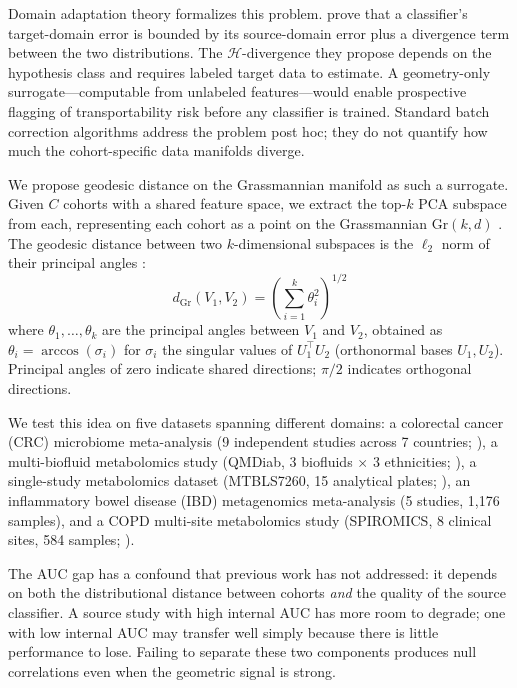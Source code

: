 \documentclass{article}
\begin{document}
Domain adaptation theory formalizes this problem. \citet{bendavid2010theory} prove that a classifier's target-domain error is bounded by its source-domain error plus a divergence term between the two distributions. The $\mathcal{H}$-divergence they propose depends on the hypothesis class and requires labeled target data to estimate. A geometry-only surrogate---computable from unlabeled features---would enable prospective flagging of transportability risk before any classifier is trained. Standard batch correction algorithms \citep{johnson2007adjusting} address the problem post hoc; they do not quantify how much the cohort-specific data manifolds diverge.

We propose geodesic distance on the Grassmannian manifold as such a surrogate. Given $C$ cohorts with a shared feature space, we extract the top-$k$ PCA subspace from each, representing each cohort as a point on the Grassmannian $\mathrm{Gr}(k, d)$ \citep{edelman1998geometry}. The geodesic distance between two $k$-dimensional subspaces is the $\ell_2$ norm of their principal angles \citep{bjorck1973numerical, ye2016schubert}:
\begin{equation}
d_{\mathrm{Gr}}(V_1, V_2) = \left(\sum_{i=1}^{k} \theta_i^2\right)^{1/2}
\end{equation}
where $\theta_1, \ldots, \theta_k$ are the principal angles between $V_1$ and $V_2$, obtained as $\theta_i = \arccos(\sigma_i)$ for $\sigma_i$ the singular values of $U_1^\top U_2$ (orthonormal bases $U_1, U_2$). Principal angles of zero indicate shared directions; $\pi/2$ indicates orthogonal directions.

We test this idea on five datasets spanning different domains: a colorectal cancer (CRC) microbiome meta-analysis (9 independent studies across 7 countries; \citealp{wirbel2019meta}), a multi-biofluid metabolomics study (QMDiab, 3 biofluids $\times$ 3 ethnicities; \citealp{yousri2015metabolic}), a single-study metabolomics dataset (MTBLS7260, 15 analytical plates; \citealp{leonletelier2024contributions}), an inflammatory bowel disease (IBD) metagenomics meta-analysis (5 studies, 1{,}176 samples), and a COPD multi-site metabolomics study (SPIROMICS, 8 clinical sites, 584 samples; \citealp{bowler2017spiromics}).

The AUC gap has a confound that previous work has not addressed: it depends on both the distributional distance between cohorts \emph{and} the quality of the source classifier. A source study with high internal AUC has more room to degrade; one with low internal AUC may transfer well simply because there is little performance to lose. Failing to separate these two components produces null correlations even when the geometric signal is strong.
\end{document}

